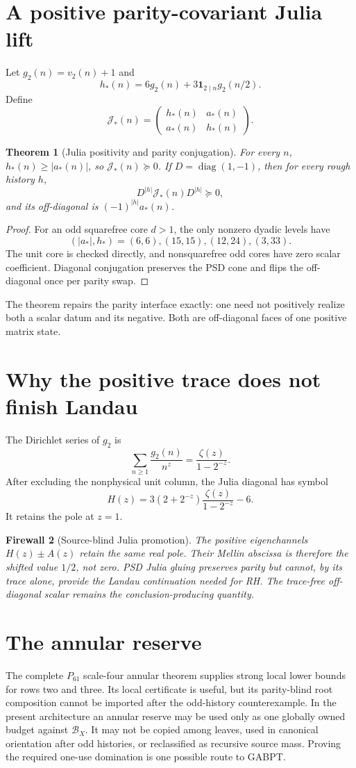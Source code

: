 \documentclass[11pt]{article}
\newtheorem{theorem}{Theorem}[section]
\newtheorem{firewall}[theorem]{Firewall}
\newcommand{\1}{\mathbf 1}
\newcommand{\BB}{\mathcal B}
\begin{document}
\section{A positive parity-covariant Julia lift}
Let \(g_2(n)=v_2(n)+1\) and
\[
h_*(n)=6g_2(n)+3\1_{2\mid n}g_2(n/2).
\]
Define
\[
\mathcal J_*(n)=\begin{pmatrix}h_*(n)&a_*(n)\\a_*(n)&h_*(n)\end{pmatrix}.
\]
\begin{theorem}[Julia positivity and parity conjugation]\label{thm:julia}
For every \(n\), \(h_*(n)\ge|a_*(n)|\), so \(\mathcal J_*(n)\succeq0\).
If \(D=\operatorname{diag}(1,-1)\), then for every rough history \(h\),
\[
D^{|h|}\mathcal J_*(n)D^{|h|}\succeq0,
\]
and its off-diagonal is \((-1)^{|h|}a_*(n)\).
\end{theorem}
\begin{proof}
For an odd squarefree core \(d>1\), the only nonzero dyadic levels have
\[
(|a_*|,h_*)=(6,6),(15,15),(12,24),(3,33).
\]
The unit core is checked directly, and nonsquarefree odd cores have zero scalar
coefficient. Diagonal conjugation preserves the PSD cone and flips the
off-diagonal once per parity swap.
\end{proof}

The theorem repairs the parity interface exactly: one need not positively
realize both a scalar datum and its negative. Both are off-diagonal faces of one
positive matrix state.

\section{Why the positive trace does not finish Landau}
The Dirichlet series of \(g_2\) is
\[
\sum_{n\ge1}\frac{g_2(n)}{n^z}=\frac{\zeta(z)}{1-2^{-z}}.
\]
After excluding the nonphysical unit column, the Julia diagonal has symbol
\[
H(z)=3(2+2^{-z})\frac{\zeta(z)}{1-2^{-z}}-6.
\]
It retains the pole at \(z=1\).

\begin{firewall}[Source-blind Julia promotion]
The positive eigenchannels \(H(z)\pm A(z)\) retain the same real pole. Their
Mellin abscissa is therefore the shifted value \(1/2\), not zero. PSD Julia
gluing preserves parity but cannot, by its trace alone, provide the Landau
continuation needed for RH. The trace-free off-diagonal scalar remains the
conclusion-producing quantity.
\end{firewall}

\section{The annular reserve}
The complete \(P_{61}\) scale-four annular theorem supplies strong local lower
bounds for rows two and three. Its local certificate is useful, but its
parity-blind root composition cannot be imported after the odd-history
counterexample. In the present architecture an annular reserve may be used only
as one globally owned budget against \(\BB_X\). It may not be copied among
leaves, used in canonical orientation after odd histories, or reclassified as
recursive source mass. Proving the required one-use domination is one possible
route to GABPT.
\end{document}
